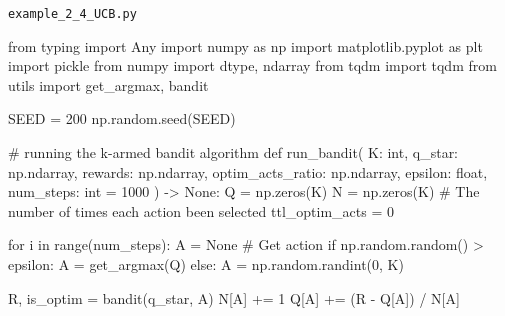 \documentclass[
  letterpaper,
]{krantz}
\makeatletter
\newenvironment{Shaded}{\begin{snugshade}}{\end{snugshade}}
\newcommand{\BuiltInTok}[1]{\textcolor[rgb]{0.00,0.23,0.31}{#1}}
\newcommand{\CommentTok}[1]{\textcolor[rgb]{0.37,0.37,0.37}{#1}}
\newcommand{\ControlFlowTok}[1]{\textcolor[rgb]{0.00,0.23,0.31}{#1}}
\newcommand{\DecValTok}[1]{\textcolor[rgb]{0.68,0.00,0.00}{#1}}
\newcommand{\ImportTok}[1]{\textcolor[rgb]{0.00,0.46,0.62}{#1}}
\newcommand{\KeywordTok}[1]{\textcolor[rgb]{0.00,0.23,0.31}{#1}}
\newcommand{\NormalTok}[1]{\textcolor[rgb]{0.00,0.23,0.31}{#1}}
\newcommand{\OperatorTok}[1]{\textcolor[rgb]{0.37,0.37,0.37}{#1}}
\newcommand{\VariableTok}[1]{\textcolor[rgb]{0.07,0.07,0.07}{#1}}
\newenvironment{kframe}{%
\medskip{}
\setlength{\fboxsep}{.8em}
 \def\at@end@of@kframe{}%
 \ifinner\ifhmode%
  \def\at@end@of@kframe{\end{minipage}}%
  \begin{minipage}{\columnwidth}%
 \fi\fi%
 \def\FrameCommand##1{\hskip\@totalleftmargin \hskip-\fboxsep
 \colorbox{shadecolor}{##1}\hskip-\fboxsep
     \hskip-\linewidth \hskip-\@totalleftmargin \hskip\columnwidth}%
 \MakeFramed {\advance\hsize-\width
   \@totalleftmargin\z@ \linewidth\hsize
   \@setminipage}}%
 {\par\unskip\endMakeFramed%
 \at@end@of@kframe}
\renewenvironment{Shaded}{\begin{kframe}}{\end{kframe}}
\theoremstyle{plain}
\theoremstyle{definition}
\theoremstyle{definition}
\theoremstyle{remark}
\makeatother
\begin{document}
\begin{codelisting}

\caption{\texttt{example\_2\_4\_UCB.py}}

\begin{Shaded}
\begin{Highlighting}[]
\ImportTok{from}\NormalTok{ typing }\ImportTok{import}\NormalTok{ Any}
\ImportTok{import}\NormalTok{ numpy }\ImportTok{as}\NormalTok{ np}
\ImportTok{import}\NormalTok{ matplotlib.pyplot }\ImportTok{as}\NormalTok{ plt}
\ImportTok{import}\NormalTok{ pickle}
\ImportTok{from}\NormalTok{ numpy }\ImportTok{import}\NormalTok{ dtype, ndarray}
\ImportTok{from}\NormalTok{ tqdm }\ImportTok{import}\NormalTok{ tqdm}
\ImportTok{from}\NormalTok{ utils }\ImportTok{import}\NormalTok{ get\_argmax, bandit}

\NormalTok{SEED }\OperatorTok{=} \DecValTok{200}
\NormalTok{np.random.seed(SEED)}


\CommentTok{\# running the k{-}armed bandit algorithm}
\KeywordTok{def}\NormalTok{ run\_bandit(}
\NormalTok{        K: }\BuiltInTok{int}\NormalTok{,}
\NormalTok{        q\_star: np.ndarray,}
\NormalTok{        rewards: np.ndarray,}
\NormalTok{        optim\_acts\_ratio: np.ndarray,}
\NormalTok{        epsilon: }\BuiltInTok{float}\NormalTok{,}
\NormalTok{        num\_steps: }\BuiltInTok{int} \OperatorTok{=} \DecValTok{1000}
\NormalTok{        ) }\OperatorTok{{-}\textgreater{}} \VariableTok{None}\NormalTok{:}
\NormalTok{    Q }\OperatorTok{=}\NormalTok{ np.zeros(K)}
\NormalTok{    N }\OperatorTok{=}\NormalTok{ np.zeros(K)  }\CommentTok{\# The number of times each action been selected}
\NormalTok{    ttl\_optim\_acts }\OperatorTok{=} \DecValTok{0}
    
    \ControlFlowTok{for}\NormalTok{ i }\KeywordTok{in} \BuiltInTok{range}\NormalTok{(num\_steps):}
\NormalTok{        A }\OperatorTok{=} \VariableTok{None}
        \CommentTok{\# Get action}
        \ControlFlowTok{if}\NormalTok{ np.random.random() }\OperatorTok{\textgreater{}}\NormalTok{ epsilon:}
\NormalTok{            A }\OperatorTok{=}\NormalTok{ get\_argmax(Q)}
        \ControlFlowTok{else}\NormalTok{:}
\NormalTok{            A }\OperatorTok{=}\NormalTok{ np.random.randint(}\DecValTok{0}\NormalTok{, K)}
        
\NormalTok{        R, is\_optim }\OperatorTok{=}\NormalTok{ bandit(q\_star, A)}
\NormalTok{        N[A] }\OperatorTok{+=} \DecValTok{1}
\NormalTok{        Q[A] }\OperatorTok{+=}\NormalTok{ (R }\OperatorTok{{-}}\NormalTok{ Q[A]) }\OperatorTok{/}\NormalTok{ N[A]}
        

\end{Highlighting}
\end{Shaded}
\end{codelisting}
\end{document}
